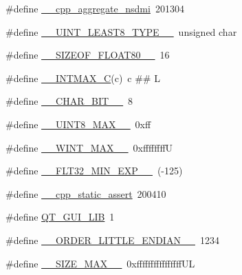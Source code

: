 \begin{DoxyCompactItemize}
\item 
\#define \hyperlink{cmake-build-debug_2babel__client__autogen_2moc__predefs_8h_ab9bf5af329c2a3a3dc5874289dda6f82}{\+\_\+\+\_\+cpp\+\_\+aggregate\+\_\+nsdmi}~201304
\item 
\#define \hyperlink{cmake-build-debug_2babel__client__autogen_2moc__predefs_8h_a5a8c0a31337df765b55c6260ef58e51e}{\+\_\+\+\_\+\+U\+I\+N\+T\+\_\+\+L\+E\+A\+S\+T8\+\_\+\+T\+Y\+P\+E\+\_\+\+\_\+}~unsigned char
\item 
\#define \hyperlink{cmake-build-debug_2babel__client__autogen_2moc__predefs_8h_acb072d4167167be73828de722a2def0b}{\+\_\+\+\_\+\+S\+I\+Z\+E\+O\+F\+\_\+\+F\+L\+O\+A\+T80\+\_\+\+\_\+}~16
\item 
\#define \hyperlink{cmake-build-debug_2babel__client__autogen_2moc__predefs_8h_adb0d09cff489746c5456407aa832fced}{\+\_\+\+\_\+\+I\+N\+T\+M\+A\+X\+\_\+C}(c)~c \#\# L
\item 
\#define \hyperlink{cmake-build-debug_2babel__client__autogen_2moc__predefs_8h_ab35e271dce6e7e2190d60b5905375419}{\+\_\+\+\_\+\+C\+H\+A\+R\+\_\+\+B\+I\+T\+\_\+\+\_\+}~8
\item 
\#define \hyperlink{cmake-build-debug_2babel__client__autogen_2moc__predefs_8h_afd12ac7489bdbbed7fa3cc51023b8f73}{\+\_\+\+\_\+\+U\+I\+N\+T8\+\_\+\+M\+A\+X\+\_\+\+\_\+}~0xff
\item 
\#define \hyperlink{cmake-build-debug_2babel__client__autogen_2moc__predefs_8h_a8925e15bce319fa2f42c659f6a3e0199}{\+\_\+\+\_\+\+W\+I\+N\+T\+\_\+\+M\+A\+X\+\_\+\+\_\+}~0xffffffffU
\item 
\#define \hyperlink{cmake-build-debug_2babel__client__autogen_2moc__predefs_8h_a300c6970bb64b04e45a9c2ed139ecce8}{\+\_\+\+\_\+\+F\+L\+T32\+\_\+\+M\+I\+N\+\_\+\+E\+X\+P\+\_\+\+\_\+}~(-\/125)
\item 
\#define \hyperlink{cmake-build-debug_2babel__client__autogen_2moc__predefs_8h_a60c56e472a1144b03053a2c7a2abb7fb}{\+\_\+\+\_\+cpp\+\_\+static\+\_\+assert}~200410
\item 
\#define \hyperlink{cmake-build-debug_2babel__client__autogen_2moc__predefs_8h_a20aa38ff6d76d6980b3c6365892110f1}{Q\+T\+\_\+\+G\+U\+I\+\_\+\+L\+IB}~1
\item 
\#define \hyperlink{cmake-build-debug_2babel__client__autogen_2moc__predefs_8h_a2b695357ce4b46971d54e8e9dfe5724f}{\+\_\+\+\_\+\+O\+R\+D\+E\+R\+\_\+\+L\+I\+T\+T\+L\+E\+\_\+\+E\+N\+D\+I\+A\+N\+\_\+\+\_\+}~1234
\item 
\#define \hyperlink{cmake-build-debug_2babel__client__autogen_2moc__predefs_8h_a66fbb70a69c9f66830f95a20e46091a6}{\+\_\+\+\_\+\+S\+I\+Z\+E\+\_\+\+M\+A\+X\+\_\+\+\_\+}~0xffffffffffffffff\+UL

\end{DoxyCompactItemize}
